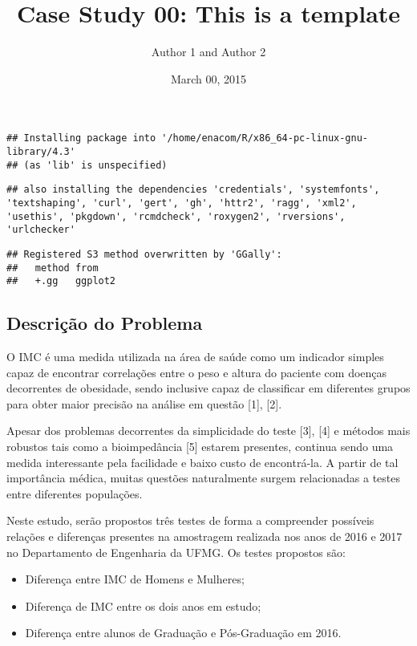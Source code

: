 \documentclass[
]{article}
\title{Case Study 00: This is a template}
\author{Author 1 and Author 2}
\date{March 00, 2015}
\providecommand{\tightlist}{%
  \setlength{\itemsep}{0pt}\setlength{\parskip}{0pt}}
\begin{document}
\maketitle

\begin{verbatim}
## Installing package into '/home/enacom/R/x86_64-pc-linux-gnu-library/4.3'
## (as 'lib' is unspecified)
\end{verbatim}

\begin{verbatim}
## also installing the dependencies 'credentials', 'systemfonts', 'textshaping', 'curl', 'gert', 'gh', 'httr2', 'ragg', 'xml2', 'usethis', 'pkgdown', 'rcmdcheck', 'roxygen2', 'rversions', 'urlchecker'
\end{verbatim}

\begin{verbatim}
## Registered S3 method overwritten by 'GGally':
##   method from   
##   +.gg   ggplot2
\end{verbatim}

\subsection{Descrição do Problema}\label{descriuxe7uxe3o-do-problema}

O IMC é uma medida utilizada na área de saúde como um indicador simples
capaz de encontrar correlações entre o peso e altura do paciente com
doenças decorrentes de obesidade, sendo inclusive capaz de classificar
em diferentes grupos para obter maior precisão na análise em questão
{[}1{]}, {[}2{]}.

Apesar dos problemas decorrentes da simplicidade do teste {[}3{]},
{[}4{]} e métodos mais robustos tais como a bioimpedância {[}5{]}
estarem presentes, continua sendo uma medida interessante pela
facilidade e baixo custo de encontrá-la. A partir de tal importância
médica, muitas questões naturalmente surgem relacionadas a testes entre
diferentes populações.

Neste estudo, serão propostos três testes de forma a compreender
possíveis relações e diferenças presentes na amostragem realizada nos
anos de 2016 e 2017 no Departamento de Engenharia da UFMG. Os testes
propostos são:

\begin{itemize}
\tightlist
\item
  Diferença entre IMC de Homens e Mulheres;
\item
  Diferença de IMC entre os dois anos em estudo;
\item
  Diferença entre alunos de Graduação e Pós-Graduação em 2016.
\end{itemize}
\end{document}
